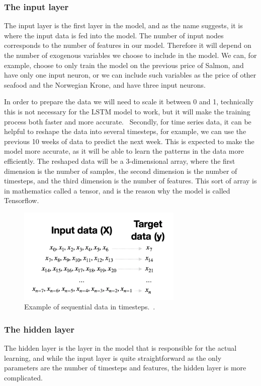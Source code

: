 \subsubsection{The input layer}
The input layer is the first layer in the model, and as the name suggests, it is where the input data is fed into the model. The number of input nodes corresponds to the number of features in our model. Therefore it will depend on the number of exogenous variables we choose to include in the model. We can, for example, choose to only train the model on the previous price of Salmon, and have only one input neuron, or we can include such variables as the price of other seafood and the Norwegian Krone, and have three input neurons. 

In order to prepare the data we will need to scale it between 0 and 1, technically this is not necessary for the LSTM model to work, but it will make the training process both faster and more accurate.~\parencite{brownlee_2019} Secondly, for time series data, it can be helpful to reshape the data into several timesteps, for example, we can use the previous 10 weeks of data to predict the next week. This is expected to make the model more accurate, as it will be able to learn the patterns in the data more efficiently. The reshaped data will be a 3-dimensional array, where the first dimension is the number of samples, the second dimension is the number of timesteps, and the third dimension is the number of features. This sort of array is in mathematics called a tensor, and is the reason why the model is called Tensorflow.~\parencite{tensorflow_tensors_2023}
\begin{figure}[H]
    \centering
    \includegraphics[width=0.7\textwidth]{data/Figures/Neural networks/Sequential_data.png}
    \caption[Example of sequential data in timesteps.]{Example of sequential data in timesteps.~\cite{dobilas_2022}.}\label{fig:Sequential_data}
\end{figure}

\subsubsection{The hidden layer}
The hidden layer is the layer in the model that is responsible for the actual learning, and while the input layer is quite straightforward as the only parameters are the number of timesteps and features, the hidden layer is more complicated. 